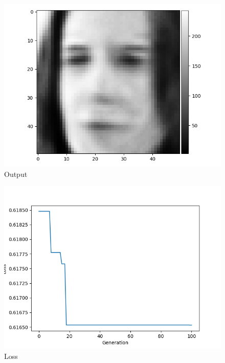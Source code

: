 \documentclass[twoside,conference,a4paper]{IEEEtran}
\begin{document}
\begin{figure}[htbp]
        \centering \includegraphics[width=1\columnwidth]{./ia_proj_images/faces_auto_encoder/esther_auto.png}
        \caption{
                \label{fig:esther_auto}
                Output
        }
\end{figure}

\begin{figure}[htbp]
        \centering \includegraphics[width=1\columnwidth]{./ia_proj_images/faces_auto_encoder/loss.png}
        \caption{
                \label{fig:loss_esther}
                Loss
        }
\end{figure}
\end{document}
